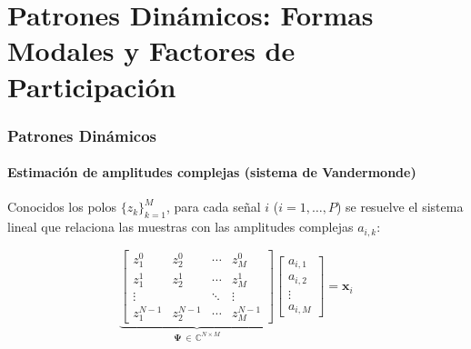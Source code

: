 \documentclass{beamer}
\begin{document}


\section{Patrones Dinámicos: Formas Modales y Factores de Participación}
\begin{frame}
\frametitle{Patrones Dinámicos}
\framesubtitle{Estimación de amplitudes complejas (sistema de Vandermonde)}

Conocidos los polos  $\{z_k\}_{k=1}^{M}$, para cada señal $i$ ($i=1,\dots,P$)
se resuelve el sistema lineal que relaciona las muestras con las amplitudes complejas
$a_{i,k}$:

\begin{equation}
    \underbrace{
    \begin{bmatrix}
        z_1^0 & z_2^0 & \cdots & z_M^0 \\
        z_1^1 & z_2^1 & \cdots & z_M^1 \\
        \vdots &      & \ddots & \vdots \\
        z_1^{N-1} & z_2^{N-1} & \cdots & z_M^{N-1}
    \end{bmatrix}
    }_{\boldsymbol{\Psi}\,\in\,\mathbb{C}^{N \times M}}
    \begin{bmatrix} a_{i,1} \\ a_{i,2} \\ \vdots \\ a_{i,M} \end{bmatrix}
    = \mathbf{x}_i
    \label{eq:vander_art}
\end{equation}
\end{frame}
\end{document}
